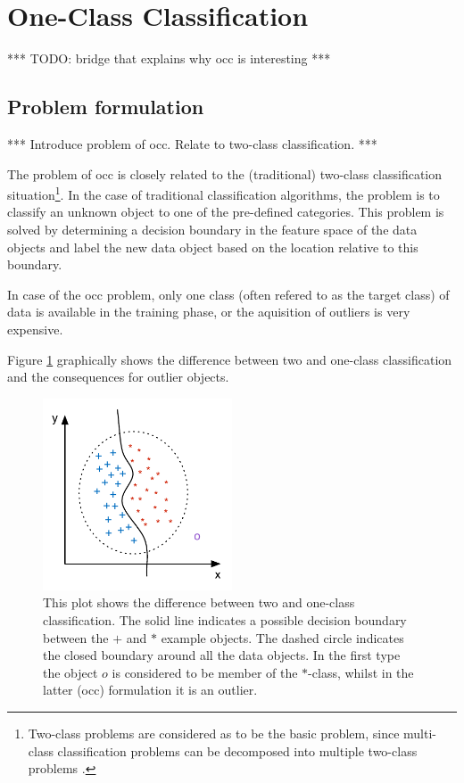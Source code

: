 \section{One-Class Classification}\label{sec:one_class_classification}

*** TODO: bridge that explains why \gls{occ} is interesting ***

\subsection{Problem formulation}\label{subsec:occ-problem-formulation}
*** Introduce problem of \gls{occ}. Relate to two-class classification. ***

The problem of \gls{occ} is closely related to the (traditional) two-class classification situation\footnote{Two-class problems are considered as to be the basic problem, since multi-class classification problems can be decomposed into multiple two-class problems \cite{fukunaga1990introduction}.}.
In the case of traditional classification algorithms, the problem is to classify an unknown object to one of the pre-defined categories.
This problem is solved by determining a decision boundary in the feature space of the data objects and label the new data object based on the location relative to this boundary.



In case of the \gls{occ} problem, only one class (often refered to as the target class) of data is available in the training phase, or the aquisition of outliers is very expensive.

Figure \ref{fig:two-vs-one-classification} graphically shows the difference between two and one-class classification and the consequences for outlier objects.

\begin{figure}
  \centering
    \includegraphics[width=0.5\textwidth,keepaspectratio]{./Figures/chapter3/two-vs-one-classification.pdf}
  \caption[Difference between two and one-class classification]{This plot shows the difference between two and one-class classification. The solid line indicates a possible decision boundary between the $+$ and $*$ example objects. The dashed circle indicates the closed boundary around all the data objects. In the first type the object $o$ is considered to be member of the $*$-class, whilst in the latter (\gls{occ}) formulation it is an outlier.}
  \label{fig:two-vs-one-classification}
\end{figure}




